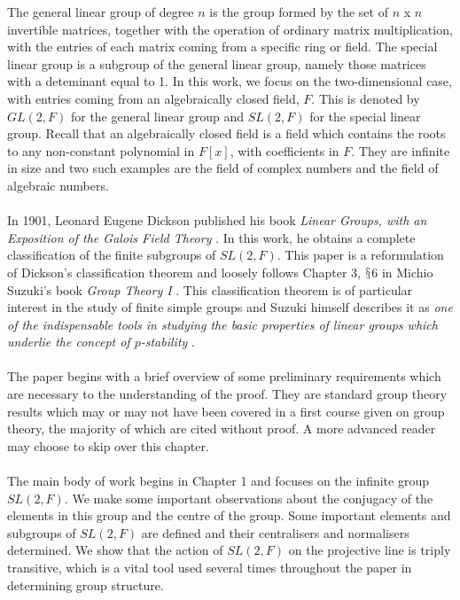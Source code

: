 \documentclass[a4paper , 11pt]{book}
\theoremstyle{definition}
\theoremstyle{remark}
\begin{document}
The general linear group of degree $n$ is the group formed by the set of $n$ x $n$ invertible matrices, together with the operation of ordinary matrix multiplication, with the entries of each matrix coming from a specific ring or field. The special linear group is a subgroup of the general linear group, namely those matrices with a deteminant equal to 1. In this work, we focus on the two-dimensional case, with entries coming from an algebraically closed field, $F$. This is denoted by $GL(2,F)$ for the general linear group and $SL(2,F)$ for the special linear group. Recall that an algebraically closed field is a field which contains the roots to any non-constant polynomial in $F[x]$, with coefficients in $F$. They are infinite in size and two such examples are the field of complex numbers and the field of algebraic numbers. \\
\vspace{-0.2mm}
\\
In 1901, Leonard Eugene Dickson published his book \textit{Linear Groups, with an Exposition of the Galois Field Theory} \cite{dickson}. In this work, he obtains a complete classification of the finite subgroups of $SL(2,F)$. This paper is a reformulation of Dickson's classification theorem and loosely follows Chapter 3, $\mathsection$6 in Michio Suzuki’s book \textit{Group Theory I} \cite{suzuki}. This classification theorem is of particular interest in the study of finite simple groups and Suzuki himself describes it as \textit{one of the indispensable tools in studying the basic properties of linear groups which underlie the concept of $p$-stability} \cite[p.392]{suzuki}. \\
\vspace{-0.2mm}
\\
The paper begins with a brief overview of some preliminary requirements which are necessary to the understanding of the proof. They are standard group theory results which may or may not have been covered in a first course given on group theory, the majority of which are cited without proof. A more advanced reader may choose to skip over this chapter. \\
\vspace{-0.2mm}
\\
The main body of work begins in Chapter 1 and focuses on the infinite group $SL(2,F)$. We make some important observations about the conjugacy of the elements in this group and the centre of the group. Some important elements and subgroups of $SL(2,F)$ are defined and their centralisers and normalisers determined. We show that the action of $SL(2,F)$ on the projective line is triply transitive, which is a vital tool used several times throughout the paper in determining group structure. \\
\end{document}
